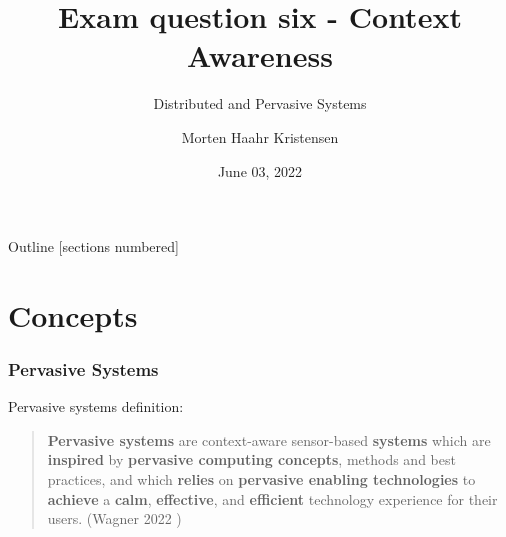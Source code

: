 \documentclass[10pt]{beamer}
\title[Context Awareness]{Exam question six - Context Awareness}
\subtitle{Distributed and Pervasive Systems}
\date{June 03, 2022}
\author[M.H. Kristensen]{Morten Haahr Kristensen}
\institute{Department of Electrical and Computer Engineering - Aarhus University}
\begin{document}
\maketitle

\begin{frame}{Outline}
  [sections numbered]
  \tableofcontents[hideallsubsections]
\end{frame}

\section{Concepts}

\begin{frame}
  \frametitle{Pervasive Systems}
  Pervasive systems definition: \\
  \vspace*{-1.0em}
  \begin{quote}
    \textbf{Pervasive systems} are context-aware sensor-based \textbf{systems} which are \textbf{inspired} by \textbf{pervasive computing concepts}, methods and best practices, and which \textbf{relies} on \textbf{pervasive enabling technologies} to \textbf{achieve} a \textbf{calm}, \textbf{effective}, and \textbf{efficient} technology experience for their users. (Wagner 2022 \cite{wagnerPervasiveComputing2022})
  \end{quote}
\end{frame}
\end{document}
